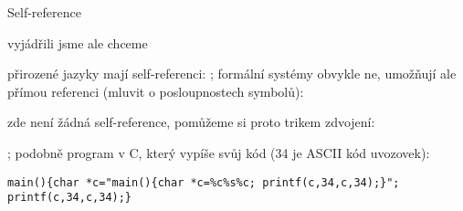 \documentclass{beamer}
\begin{document}
\begin{frame}[fragile]{Self-reference}

    \vspace{-6pt}
    vyjádřili jsme  ale chceme 
    
    přirozené jazyky mají self-referenci:
    ;  
    formální systémy obvykle ne, umožňují ale \alert{přímou referenci} (mluvit o posloupnostech symbolů):
    
    \medskip


    \medskip

    zde není žádná self-reference, pomůžeme si proto trikem \alert{zdvojení}:
    
    \medskip


    \medskip

    ; podobně program v C, který vypíše svůj kód (34 je ASCII kód uvozovek): 

    \vspace{-6pt}
    {\small
    \begin{verbatim}
main(){char *c="main(){char *c=%c%s%c; printf(c,34,c,34);}"; 
printf(c,34,c,34);}  
    \end{verbatim}
    }    

\end{frame}
\end{document}
